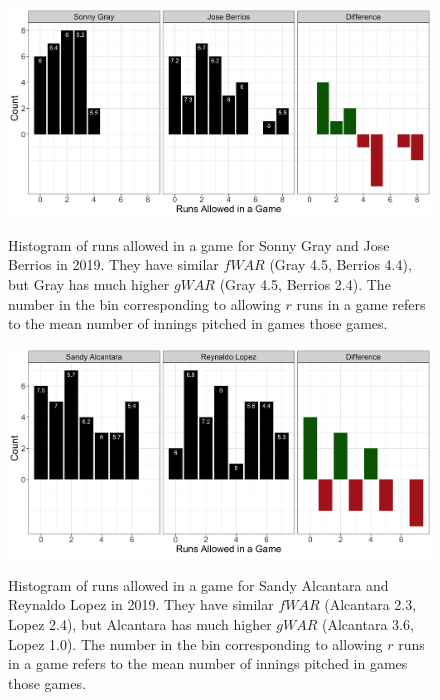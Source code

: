 \documentclass[12pt]{article}
\begin{document}
\begin{figure}[t!]
\centering
\caption{Histogram of runs allowed in a game for Sonny Gray and Jose Berrios in 2019. They have similar $fWAR$ (Gray 4.5, Berrios 4.4), but Gray has much higher $gWAR$ (Gray 4.5, Berrios 2.4). The number in the bin corresponding to allowing $r$ runs in a game refers to the mean number of innings pitched in games those games.} 
\includegraphics[width=15cm]{../writeup_plots/p3_2019.png}
\label{fig:p3}
\end{figure}


\begin{figure}[t!]
\centering
\caption{Histogram of runs allowed in a game for Sandy Alcantara and Reynaldo Lopez in 2019. They have similar $fWAR$ (Alcantara 2.3, Lopez 2.4), but Alcantara has much higher $gWAR$ (Alcantara 3.6, Lopez 1.0). The number in the bin corresponding to allowing $r$ runs in a game refers to the mean number of innings pitched in games those games.} 
\includegraphics[width=15cm]{../writeup_plots/p5_2019.png}
\label{fig:p5}
\end{figure}





\end{document}
